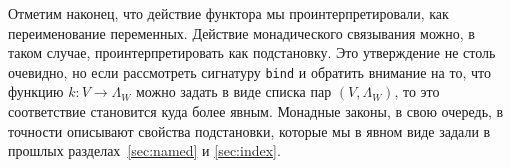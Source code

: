 Отметим наконец, что действие функтора мы проинтерпретировали, как переименование переменных. Действие монадического связывания можно, в таком случае, проинтерпретировать как подстановку. Это утверждение не столь очевидно, но если рассмотреть сигнатуру \texttt{bind} и обратить внимание на то, что функцию $k : V \to \Lambda_{W}$ можно задать в виде списка пар $(V, \Lambda_{W})$, то это соответствие становится куда более явным. Монадные законы, в свою очередь, в точности описывают свойства подстановки, которые мы в явном виде задали в прошлых разделах~\ref{sec:named} и \ref{sec:index}.
